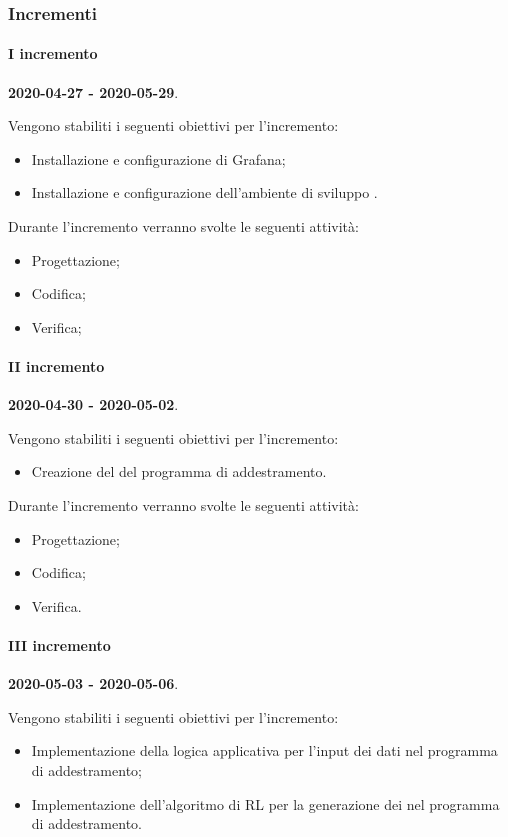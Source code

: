 \documentclass[../piano-di-progetto.tex]{subfiles}
\begin{document}
\subsubsection{Incrementi}

\paragraph{I incremento}
\textbf{2020-04-27 - 2020-05-29}. 
 
 Vengono stabiliti i seguenti obiettivi per l'incremento:
 \begin{itemize}
     \item Installazione e configurazione di Grafana;
     \item Installazione e configurazione dell'ambiente di sviluppo .
 \end{itemize}

Durante l'incremento verranno svolte le seguenti attività: 
\begin{itemize}
    \item Progettazione;
    \item Codifica;
    \item Verifica;
\end{itemize}

\paragraph{II incremento}
\textbf{2020-04-30 - 2020-05-02}. 
 
 Vengono stabiliti i seguenti obiettivi per l'incremento:
 \begin{itemize}
     \item Creazione del  del programma di addestramento.
 \end{itemize}

Durante l'incremento verranno svolte le seguenti attività: 
\begin{itemize}
    \item Progettazione;
    \item Codifica;
    \item Verifica.
\end{itemize}


\paragraph{III incremento}
\textbf{2020-05-03 - 2020-05-06}. 
 
 Vengono stabiliti i seguenti obiettivi per l'incremento:
 \begin{itemize}
     \item Implementazione della logica applicativa per l'input dei dati nel programma di addestramento;
     \item Implementazione dell'algoritmo di RL per la generazione dei  nel programma di addestramento.
 \end{itemize}
\end{document}
